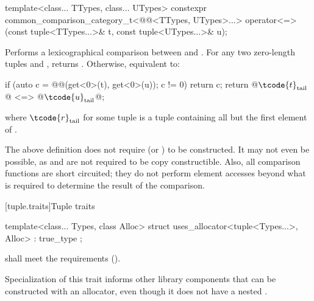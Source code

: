 %
\begin{itemdecl}
template<class... TTypes, class... UTypes>
  constexpr common_comparison_category_t<@@<TTypes, UTypes>...>
    operator<=>(const tuple<TTypes...>& t, const tuple<UTypes...>& u);
\end{itemdecl}

\begin{itemdescr}
\pnum
\effects
Performs a lexicographical comparison between  and .
For any two zero-length tuples  and ,
 returns .
Otherwise, equivalent to:
\begin{codeblock}
if (auto c = @@(get<0>(t), get<0>(u)); c != 0) return c;
return @$\tcode{t}_\mathrm{tail}$@ <=> @$\tcode{u}_\mathrm{tail}$@;
\end{codeblock}
where $\tcode{r}_\mathrm{tail}$ for some tuple 
is a tuple containing all but the first element of .
\end{itemdescr}

\pnum
\begin{note}
The above definition does not require 
(or ) to be constructed. It may not
even be possible, as  and  are not required to be copy
constructible. Also, all comparison functions are short circuited;
they do not perform element accesses beyond what is required to determine the
result of the comparison.
\end{note}

[tuple.traits]{Tuple traits}

%
\begin{itemdecl}
template<class... Types, class Alloc>
  struct uses_allocator<tuple<Types...>, Alloc> : true_type { };
\end{itemdecl}

\begin{itemdescr}
\pnum
\requires {} shall meet the 
requirements ().

\pnum
\begin{note}
Specialization of this trait informs other library components that
 can be constructed with an allocator, even though it does not have
a nested .
\end{note}
\end{itemdescr}

